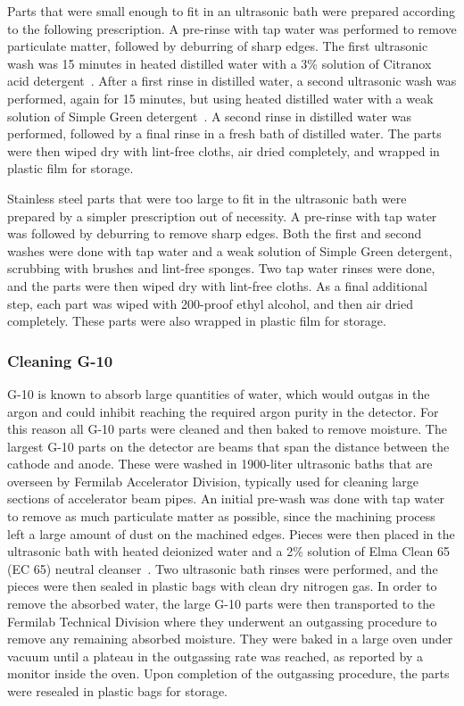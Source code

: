 Parts that were small enough to fit in an ultrasonic bath were prepared according to the following prescription. A pre-rinse with tap water was performed to remove particulate matter, followed by deburring of sharp edges. The first ultrasonic wash was 15 minutes in heated distilled water with a 3\% solution of Citranox acid detergent~\cite{citranox}. After a first rinse in distilled water, a second ultrasonic wash was performed, again for 15 minutes, but using heated distilled water with a weak solution of Simple Green detergent~\cite{simplegreen}. A second rinse in distilled water was performed, followed by a final rinse in a fresh bath of distilled water. The parts were then wiped dry with lint-free cloths, air dried completely, and wrapped in plastic film for storage.

Stainless steel parts that were too large to fit in the ultrasonic bath were prepared by a simpler prescription out of necessity. A pre-rinse with tap water was followed by deburring to remove sharp edges. Both the first and second washes were done with tap water and a weak solution of Simple Green detergent, scrubbing with brushes and lint-free sponges. Two tap water rinses were done, and the parts were then wiped dry with lint-free cloths. As a final additional step, each part was wiped with 200-proof ethyl alcohol, and then air dried completely. These parts were also wrapped in plastic film for storage.

\subsubsection{Cleaning G-10}

G-10 is known to absorb large quantities of water, which would outgas in the argon and could inhibit reaching the required argon purity in the detector. For this reason all G-10 parts were cleaned and then baked to remove moisture. The largest G-10 parts on the detector are beams that span the distance between the cathode and anode. These were washed in 1900-liter ultrasonic baths that are overseen by Fermilab Accelerator Division, typically used for cleaning large sections of accelerator beam pipes. An initial pre-wash was done with tap water to remove as much particulate matter as possible, since the machining process left a large amount of dust on the machined edges.  Pieces were then placed in the ultrasonic bath with heated deionized water and a 2\% solution of Elma Clean 65 (EC 65) neutral cleanser~\cite{elmaclean}. Two ultrasonic bath rinses were performed, and the pieces were then sealed in plastic bags with clean dry nitrogen gas. In order to remove the absorbed water, the large G-10 parts were then transported to the Fermilab Technical Division where they underwent an outgassing procedure to remove any remaining absorbed moisture.  They were baked in a large oven under vacuum until a plateau in the outgassing rate was reached, as reported by a monitor inside the oven. Upon completion of the outgassing procedure, the parts were resealed in plastic bags for storage.


